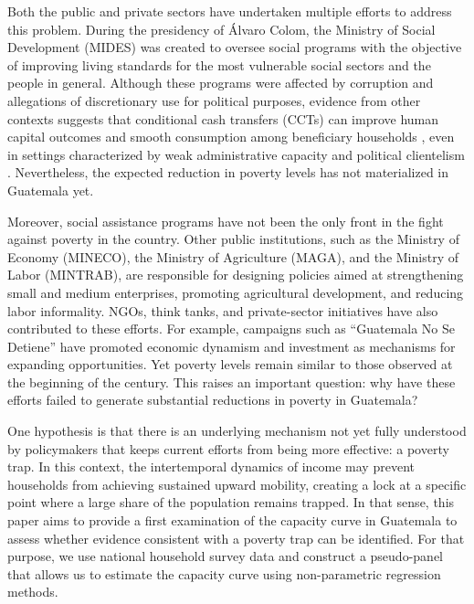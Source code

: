 \documentclass{article}
\begin{document}
Both the public and private sectors have undertaken multiple efforts to address this problem. During the presidency of Álvaro Colom, the Ministry of Social Development (MIDES) was created to oversee social programs with the objective of improving living standards for the most vulnerable social sectors and the people in general. Although these programs were affected by corruption and allegations of discretionary use for political purposes, evidence from other contexts suggests that conditional cash transfers (CCTs) can improve human capital outcomes and smooth consumption among beneficiary households \parencite{banerjee2011poor}, even in settings characterized by weak administrative capacity and political clientelism \parencite{kim2015cct}. Nevertheless, the expected reduction in poverty levels has not materialized in Guatemala yet. 

Moreover, social assistance programs have not been the only front in the fight against poverty in the country. Other public institutions, such as the Ministry of Economy (MINECO), the Ministry of Agriculture (MAGA), and the Ministry of Labor (MINTRAB), are responsible for designing policies aimed at strengthening small and medium enterprises, promoting agricultural development, and reducing labor informality. NGOs, think tanks, and private-sector initiatives have also contributed to these efforts. For example, campaigns such as “Guatemala No Se Detiene” have promoted economic dynamism and investment as mechanisms for expanding opportunities. Yet poverty levels remain similar to those observed at the beginning of the century. This raises an important question: why have these efforts failed to generate substantial reductions in poverty in Guatemala? 

One hypothesis is that there is an underlying mechanism not yet fully understood by policymakers that keeps current efforts from being more effective: a poverty trap. In this context, the intertemporal dynamics of income may prevent households from achieving sustained upward mobility, creating a lock at a specific point where a large share of the population remains trapped. In that sense, this paper aims to provide a first examination of the capacity curve in Guatemala to assess whether evidence consistent with a poverty trap can be identified. For that purpose, we use national household survey data and construct a pseudo-panel that allows us to estimate the capacity curve using non-parametric regression methods. 
\end{document}
